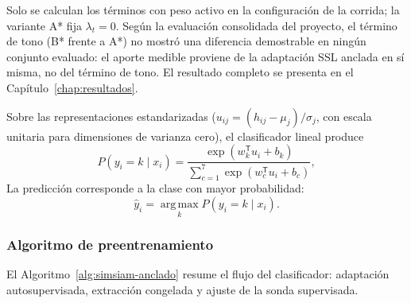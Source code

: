 Solo se calculan los términos con peso activo en la configuración de la corrida; la variante A* fija $\lambda_t=0$. Según la evaluación consolidada del proyecto, el término de tono (B* frente a A*) no mostró una diferencia demostrable en ningún conjunto evaluado: el aporte medible proviene de la adaptación SSL anclada en sí misma, no del término de tono. El resultado completo se presenta en el Capítulo~\ref{chap:resultados}.

Sobre las representaciones estandarizadas ($u_{ij}=(h_{ij}-\mu_j)/\sigma_j$, con escala unitaria para dimensiones de varianza cero), el clasificador lineal produce
\begin{equation}
 P(y_i=k\mid x_i)=\frac{\exp(w_k^{\mathsf T}u_i+b_k)}{\sum_{c=1}^{7}\exp(w_c^{\mathsf T}u_i+b_c)},
\end{equation}
La predicción corresponde a la clase con mayor probabilidad:
\begin{equation}
 \widehat y_i=\operatorname*{arg\,max}_{k}P(y_i=k\mid x_i).
\end{equation}

\subsubsection{Algoritmo de preentrenamiento}

El Algoritmo~\ref{alg:simsiam-anclado} resume el flujo del clasificador: adaptación autosupervisada, extracción congelada y ajuste de la sonda supervisada.

